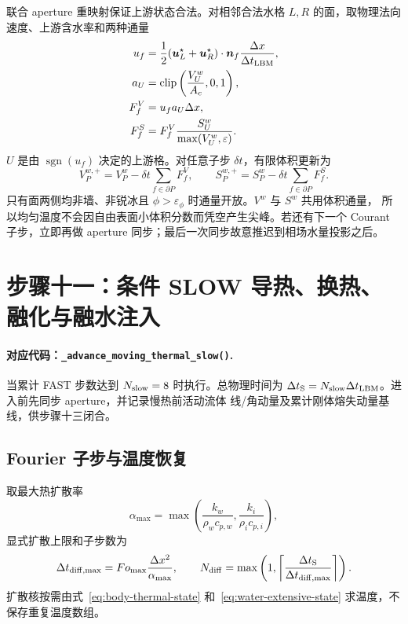 \documentclass[UTF8,zihao=-4]{ctexart}
\newcommand{\vect}[1]{\boldsymbol{#1}}
\newcommand{\clip}{\operatorname{clip}}
\newcommand{\sgn}{\operatorname{sgn}}
\newcommand{\code}[1]{\texttt{#1}}
\newcommand{\cellarea}{A_c}
\newcommand{\stepname}[1]{\paragraph{对应代码：\code{#1}.}}
\numberwithin{equation}{section}
\begin{document}
联合 aperture 重映射保证上游状态合法。对相邻合法水格
$L,R$ 的面，取物理法向速度、上游含水率和两种通量
\begin{align}
  u_f&=\frac12(\vect u_L^\star+\vect u_R^\star)\cdot\vect n_f
  \frac{\Delta x}{\Delta t_{\rm LBM}},\\
  a_U&=\clip\left(\frac{V_U^w}{\cellarea},0,1\right),\\
  F_f^V&=u_fa_U\Delta x,\\
  F_f^S&=F_f^V\frac{S_U^w}{\max(V_U^w,\varepsilon)}.
  \label{eq:paired-upwind-flux}
\end{align}
$U$ 是由 $\sgn(u_f)$ 决定的上游格。对任意子步 $\delta t$，有限体积更新为
\begin{equation}
  V_P^{w,+}=V_P^w-\delta t\sum_{f\in\partial P}F_f^V,
  \qquad
  S_P^{w,+}=S_P^w-\delta t\sum_{f\in\partial P}F_f^S.
  \label{eq:paired-upwind-update}
\end{equation}
只有面两侧均非墙、非锐冰且 $\phi>\varepsilon_\phi$ 时通量开放。$V^w$ 与 $S^w$ 共用体积通量，
所以均匀温度不会因自由表面小体积分数而凭空产生尖峰。若还有下一个 Courant 子步，立即再做
aperture 同步；最后一次同步故意推迟到相场水量投影之后。

\section{步骤十一：条件 SLOW 导热、换热、融化与融水注入}

\stepname{\_advance\_moving\_thermal\_slow()}
当累计 FAST 步数达到 $N_{\rm slow}=8$ 时执行。总物理时间为
$\Delta t_{\rm S}=N_{\rm slow}\Delta t_{\rm LBM}$。进入前先同步 aperture，并记录慢热前活动流体
线/角动量及累计刚体熔失动量基线，供步骤十三闭合。

\subsection{Fourier 子步与温度恢复}

取最大热扩散率
\begin{equation}
  \alpha_{\max}=\max\left(\frac{k_w}{\rho_wc_{p,w}},
  \frac{k_i}{\rho_ic_{p,i}}\right),
\end{equation}
显式扩散上限和子步数为
\begin{equation}
  \Delta t_{\rm diff,max}=Fo_{\max}\frac{\Delta x^2}{\alpha_{\max}},
  \qquad
  N_{\rm diff}=\max\left(1,
  \left\lceil\frac{\Delta t_{\rm S}}{\Delta t_{\rm diff,max}}\right\rceil\right).
  \label{eq:diffusion-substeps}
\end{equation}
扩散核按需由式~\eqref{eq:body-thermal-state} 和~\eqref{eq:water-extensive-state} 求温度，不保存重复温度数组。
\end{document}
